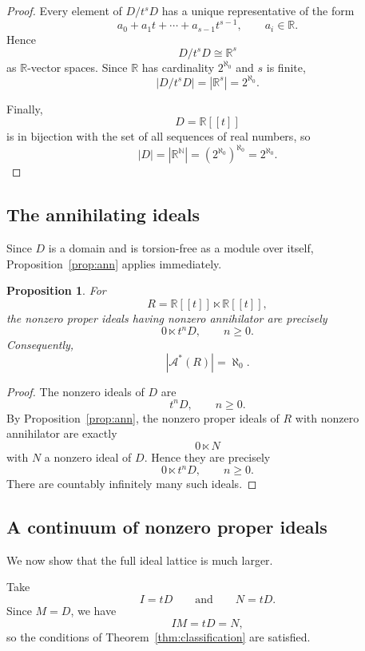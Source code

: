 \documentclass[11pt]{article}
\newtheorem{proposition}[theorem]{Proposition}
\theoremstyle{definition}
\theoremstyle{remark}
\newcommand{\lt}{\ltimes}
\begin{document}
	\begin{proof}
		Every element of $D/t^sD$ has a unique representative of the form
		\[
		a_0+a_1t+\cdots+a_{s-1}t^{s-1},
		\qquad a_i\in\mathbb R.
		\]
		Hence
		\[
		D/t^sD\cong\mathbb R^s
		\]
		as $\mathbb R$-vector spaces. Since $\mathbb R$ has cardinality
		$2^{\aleph_0}$ and $s$ is finite,
		\[
		|D/t^sD|=|\mathbb R^s|=2^{\aleph_0}.
		\]
		
		Finally,
		\[
		D=\mathbb R[[t]]
		\]
		is in bijection with the set of all sequences of real numbers, so
		\[
		|D|
		=
		|\mathbb R^{\mathbb N}|
		=
		(2^{\aleph_0})^{\aleph_0}
		=
		2^{\aleph_0}.
		\]
	\end{proof}
	
	
	\subsection{The annihilating ideals}
	
	Since $D$ is a domain and is torsion-free as a module over itself,
	Proposition~\ref{prop:ann} applies immediately.
	
	\begin{proposition}
		\label{prop:ann-example}
		For
		\[
		R=\mathbb R[[t]]\lt\mathbb R[[t]],
		\]
		the nonzero proper ideals having nonzero annihilator are precisely
		\[
		0\ltimes t^nD,
		\qquad n\geq0.
		\]
		Consequently,
		\[
		|\mathcal A^*(R)|=\aleph_0.
		\]
	\end{proposition}
	
	\begin{proof}
		The nonzero ideals of $D$ are
		\[
		t^nD,
		\qquad n\geq0.
		\]
		By Proposition~\ref{prop:ann}, the nonzero proper ideals of $R$ with
		nonzero annihilator are exactly
		\[
		0\ltimes N
		\]
		with $N$ a nonzero ideal of $D$. Hence they are precisely
		\[
		0\ltimes t^nD,
		\qquad n\geq0.
		\]
		There are countably infinitely many such ideals.
	\end{proof}
	
	
	\subsection{A continuum of nonzero proper ideals}
	
	We now show that the full ideal lattice is much larger.
	
	Take
	\[
	I=tD
	\qquad\text{and}\qquad
	N=tD.
	\]
	Since $M=D$, we have
	\[
	IM=tD=N,
	\]
	so the conditions of Theorem~\ref{thm:classification} are satisfied.
	
\end{document}
